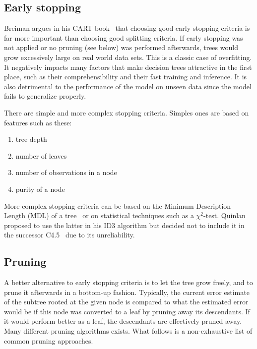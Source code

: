 
\subsection{Early stopping}
Breiman argues in his CART book~\cite{cart} that choosing good early stopping criteria is far more important than choosing good splitting criteria. If early stopping was not applied or no pruning (see below) was performed afterwards, trees would grow excessively large on real world data sets. This is a classic case of overfitting. It negatively impacts many factors that make decision trees attractive in the first place, such as their comprehensibility and their fast training and inference. It is also detrimental to the performance of the model on unseen data since the model fails to generalize properly.

There are simple and more complex stopping criteria. Simples ones are based on features such as these:
\begin{enumerate}
    \item tree depth
    \item number of leaves
    \item number of observations in a node
    \item purity of a node
\end{enumerate}

More complex stopping criteria can be based on the Minimum Description Length (MDL) of a tree~\cite{mdlstopping} or on statistical techniques such as a $\chi^2$-test. Quinlan proposed to use the latter in his ID3 algorithm but decided not to include it in the successor C4.5~\cite{id3ter, c45} due to its unreliability.

\subsection{Pruning}
A better alternative to early stopping criteria is to let the tree grow freely, and to prune it afterwards in a bottom-up fashion. Typically, the current error estimate of the subtree rooted at the given node is compared to what the estimated error would be if this node was converted to a leaf by pruning away its descendants. If it would perform better as a leaf, the descendants are effectively pruned away. Many different pruning algorithms exists. What follows is a non-exhaustive list of common pruning approaches.

